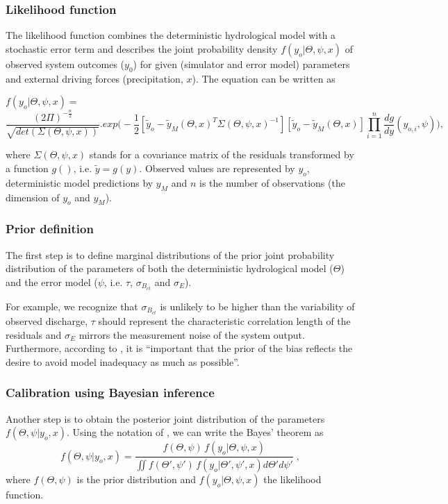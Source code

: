 \documentclass{ctuthesis}\usepackage[]{graphicx}\usepackage[]{color}
\begin{document}
\subsubsection{Likelihood function} \label{LikeliTheor}

The likelihood function combines the deterministic hydrological model with a stochastic error term and describes the joint probability density $ f (y_{o}|\Theta, \psi, x) $ of observed system outcomes ($y_{0}$) for given (simulator and error model) parameters  and external driving forces (precipitation, $x$). The equation can be written as

$ f (y_{o}|\Theta, \psi, x) = $
\begin{equation}
 \frac{(2\Pi)^{-\frac{n}{2}}}{\sqrt{det(\Sigma(\Theta, \psi, x))}}  . exp \Big( -\frac{1}{2}  [ \tilde{y}_{o} - \tilde{y}_{M}(\Theta, x)^{T}  \Sigma(\Theta, \psi, x)^{-1} ]  [ \tilde{y}_{o} - \tilde{y}_{M}(\Theta, x)]  \prod^{n}_{i=1} \frac{dg}{dy} (y_{o,i},\psi) \Big),
\end{equation}

where $\Sigma(\Theta, \psi, x)$ stands for a covariance matrix of the residuals transformed by a function $g()$, i.e. $\tilde{y}=g(y)$. Observed values are represented by $y_{o}$, deterministic model predictions by $y_{M}$ and $n$ is the number of observations (the dimension of $y_{o}$ and $y_{M}$).



\subsubsection{Prior definition} \label{priorTheor}
The first step is to define marginal distributions of the prior joint probability distribution of the parameters of  both the deterministic hydrological model ($\Theta$) and the error model ($\psi$, i.e. $\tau$,  $\sigma_{B_{ct}}$ and  $\sigma_E$). 

 For example, we recognize that $\sigma_{B_{ct}}$ is unlikely to be higher than the variability of observed discharge, $\tau$ should represent the characteristic correlation length of the residuals and  $\sigma_E$ mirrors the measurement noise of the system output. Furthermore, according to \cite{giudice2013improving}, it is \enquote{important that the prior of the bias reflects the desire to avoid model inadequacy as much as possible}. 




\subsubsection{Calibration using Bayesian inference} \label{calibTheor}
Another step is to obtain the posterior joint distribution of the parameters $ f (\Theta, \psi | y_o, x) $. Using the notation of \cite{giudice2013improving}, we can write the Bayes' theorem as
\begin{equation}
 f (\Theta, \psi | y_o, x) = \frac{ f(\Theta, \psi) \, f(y_o | \Theta, \psi, x) } { \iint f(\Theta' , \psi') \, f(y_o | \Theta', \psi', x) d\Theta' d\psi'} \; ,
\end{equation}
where $f(\Theta, \psi)$ is the prior distribution  and $ f(y_o | \Theta, \psi, x)$ the likelihood function.
\end{document}
